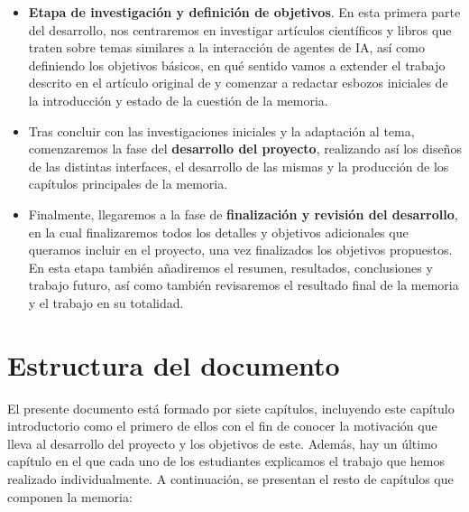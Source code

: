 \begin{itemize}
	
	\item \textbf{Etapa de investigación y definición de objetivos}. En esta primera parte del desarrollo, nos centraremos en investigar artículos científicos y libros que traten sobre temas similares a la interacción de agentes de IA, así como definiendo los objetivos básicos, en qué sentido vamos a extender el trabajo descrito en el artículo original de \ga y comenzar a redactar esbozos iniciales de la introducción y estado de la cuestión de la memoria.
	
	\item Tras concluir con las investigaciones iniciales y la adaptación al tema, comenzaremos la fase del \textbf{desarrollo del proyecto}, realizando así los diseños de las distintas interfaces, el desarrollo de las mismas y la producción de los capítulos principales de la memoria.
	
	\item Finalmente, llegaremos a la fase de \textbf{finalización y revisión del desarrollo}, en la cual finalizaremos todos los detalles y objetivos adicionales que queramos incluir en el proyecto, una vez finalizados los objetivos propuestos. En esta etapa también añadiremos el resumen, resultados, conclusiones y trabajo futuro, así como también revisaremos el resultado final de la memoria y el trabajo en su totalidad.
\end{itemize}



\section{Estructura del documento}
El presente documento está formado por siete capítulos, incluyendo este capítulo introductorio como el primero de ellos con el fin de conocer la motivación que lleva al desarrollo del proyecto y los objetivos de este. Además, hay un último capítulo en el que cada uno de los estudiantes explicamos el trabajo que hemos realizado individualmente. A continuación, se presentan el resto de capítulos que componen la memoria: 

